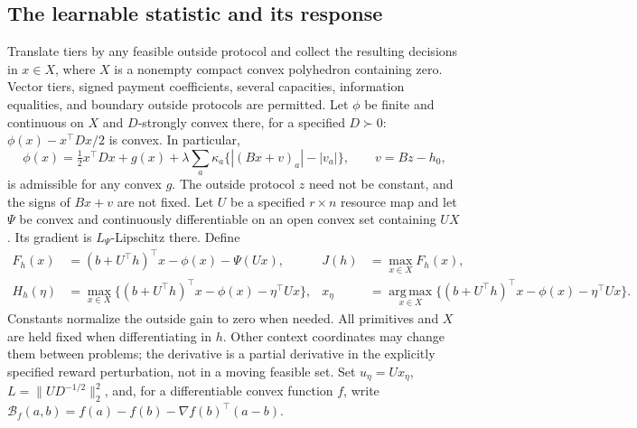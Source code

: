 \documentclass[11pt,letterpaper]{article}
\theoremstyle{definition}
\newcommand{\1}{\mathbf 1}
\newcommand{\argmax}{\operatorname*{arg\,max}}
\begin{document}
\subsection{The learnable statistic and its response}
Translate tiers by any feasible outside protocol and collect the resulting decisions in $x\in X$, where $X$ is a nonempty compact convex polyhedron containing zero. Vector tiers, signed payment coefficients, several capacities, information equalities, and boundary outside protocols are permitted. Let $\phi$ be finite and continuous on $X$ and $D$-strongly convex there, for a specified $D\succ0$: $\phi(x)-x^\top Dx/2$ is convex. In particular,
\[
 \phi(x)=\tfrac12x^\top Dx+g(x)
       +\lambda\sum_a\kappa_a\{|(Bx+v)_a|-|v_a|\},
 \qquad v=Bz-h_0,
\]
is admissible for any convex $g$. The outside protocol $z$ need not be constant, and the signs of $Bx+v$ are not fixed. Let $U$ be a specified $r\times n$ resource map and let $\Psi$ be convex and continuously differentiable on an open convex set containing $UX$. Its gradient is $L_\Psi$-Lipschitz there. Define
\begin{align}
 F_h(x)&=(b+U^\top h)^\top x-\phi(x)-\Psi(Ux), &
 J(h)&=\max_{x\in X}F_h(x),\label{eq:r19-program}\\
 H_h(\eta)&=\max_{x\in X}\{(b+U^\top h)^\top x-\phi(x)-\eta^\top Ux\},&
 x_\eta&=\argmax_{x\in X}\{(b+U^\top h)^\top x-\phi(x)-\eta^\top Ux\}.
 \label{eq:r19-response}
\end{align}
Constants normalize the outside gain to zero when needed. All primitives and $X$ are held fixed when differentiating in $h$. Other context coordinates may change them between problems; the derivative is a partial derivative in the explicitly specified reward perturbation, not in a moving feasible set. Set $u_\eta=Ux_\eta$, $L=\|UD^{-1/2}\|_2^2$, and, for a differentiable convex function $f$, write
$\mathcal B_f(a,b)=f(a)-f(b)-\nabla f(b)^\top(a-b)$.
\end{document}
